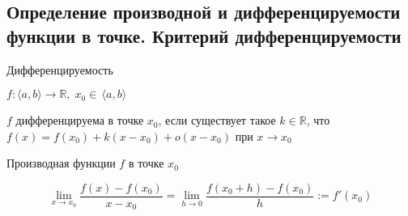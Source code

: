 \subsection{Определение производной и дифференцируемости функции в точке. Критерий дифференцируемости \href{https://youtu.be/OXDjegAsmSU?t=127}{\Walley}}
\begin{conj}
    Дифференцируемость

    $f: \langle a, b \rangle \to \mathbb{R}, \; x_0 \in \, \langle a, b \rangle$

    $f$ дифференцируема в точке $x_0$, если существует такое $k \in \mathbb{R}$, 
    что $f(x) = f(x_0) + k(x - x_0) + o(x - x_0)$ при $x \to x_0$
\end{conj}

\begin{conj}
    Производная функции $f$ в точке $x_0$

    \[ \lim_{x \to x_0} \frac{f(x) - f(x_0)}{x - x_0} = \lim_{h \to 0} \frac{f(x_0 + h) - f(x_0)}{h}
    := f'(x_0) \]
\end{conj}

